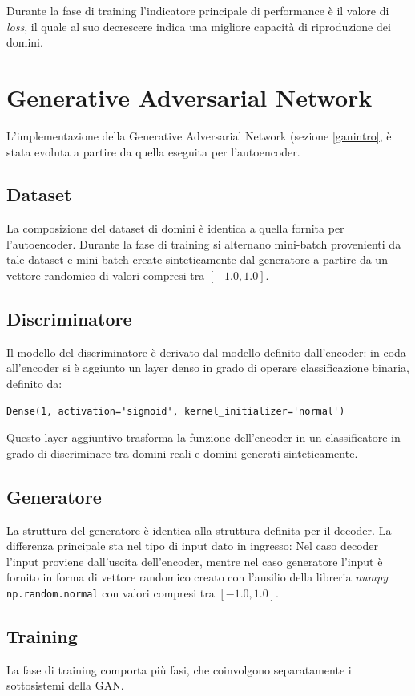 Durante la fase di training l'indicatore principale di performance è il valore di \textit{loss}, il quale al suo decrescere indica una migliore capacità di riproduzione dei domini.

\section{Generative Adversarial Network}
\label{imp:gan}
L'implementazione della Generative Adversarial Network (sezione \ref{ganintro}, è stata evoluta a partire da quella eseguita per l'autoencoder. 

\subsection{Dataset}
La composizione del dataset di domini è identica a quella fornita per l'autoencoder. Durante la fase di training si alternano mini-batch provenienti da tale dataset e mini-batch create sinteticamente dal generatore a partire da un vettore randomico di valori compresi tra $[-1.0,1.0]$.

\subsection{Discriminatore}
Il modello del discriminatore è derivato dal modello definito dall'encoder: in coda all'encoder si è aggiunto un layer denso in grado di operare classificazione binaria, definito da: 

\begin{lstlisting}
Dense(1, activation='sigmoid', kernel_initializer='normal')
\end{lstlisting}

Questo layer aggiuntivo trasforma la funzione dell'encoder in un classificatore in grado di discriminare tra domini reali e domini generati sinteticamente.

\subsection{Generatore}
La struttura del generatore è identica alla struttura definita per il decoder. La differenza principale sta nel tipo di input dato in ingresso: Nel caso decoder l'input proviene dall'uscita dell'encoder, mentre nel caso generatore l'input è fornito in forma di vettore randomico creato con l'ausilio della libreria \textit{numpy} \cite{numpy} \lstinline!np.random.normal! con valori compresi tra $[-1.0,1.0]$.

\subsection{Training}
La fase di training comporta più fasi, che coinvolgono separatamente i sottosistemi della GAN.

